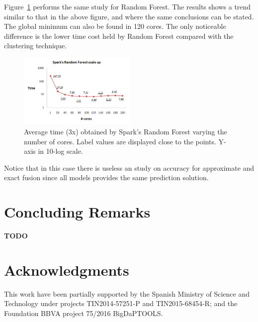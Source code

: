 \documentclass[3p,review]{elsarticle}
\newcommand{\TODO}{\textbf{TODO}}
\begin{document}
Figure~\ref{fig:rf-spark} performs the same study for Random Forest. The results shows a trend similar to that in the above figure, and where the same conclusions can be stated. The global minimum can also be found in 120 cores. The only noticeable difference is the lower time cost held by Random Forest compared with the clustering technique.

\begin{figure}[htp]
    \centering
    \includegraphics[width=0.5\textwidth]{rf-spark}
    \caption{Average time (3x) obtained by Spark's Random Forest varying the number of cores. Label values are displayed close to the points. Y-axis in 10-log scale.}
    \label{fig:rf-spark}
\end{figure}

Notice that in this case there is useless an study on accuracy for approximate and exact fusion since all models provides the same prediction solution.

\section{Concluding Remarks}\label{sec:conclusions}

\TODO

\section*{Acknowledgments}\label{sec:ack}

This work have been partially supported by the Spanish Ministry of Science and Technology under projects TIN2014-57251-P and TIN2015-68454-R; and the Foundation BBVA project 75/2016 BigDaPTOOLS.




\end{document}
